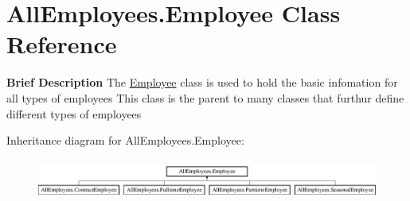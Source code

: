 \hypertarget{class_all_employees_1_1_employee}{}\section{All\+Employees.\+Employee Class Reference}
\label{class_all_employees_1_1_employee}


{\bfseries Brief Description} The \hyperlink{class_all_employees_1_1_employee}{Employee} class is used to hold the basic infomation for all types of employees This class is the parent to many classes that furthur define different types of employees  


Inheritance diagram for All\+Employees.\+Employee\+:\begin{figure}[H]
\begin{center}
\leavevmode
\includegraphics[height=1.352657cm]{class_all_employees_1_1_employee}
\end{center}
\end{figure}
